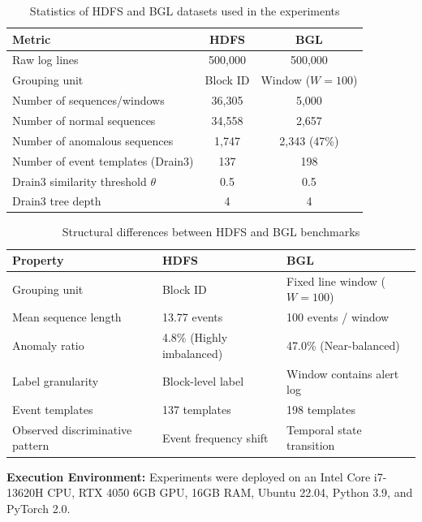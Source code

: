 \documentclass[conference]{IEEEtran}
\begin{document}
\begin{table}[!t]
\caption{Statistics of HDFS and BGL datasets used in the experiments}
\begin{center}
\scriptsize
\begin{tabular}{lcc}
\toprule
\textbf{Metric} & \textbf{HDFS} & \textbf{BGL} \\
\midrule
Raw log lines & 500,000 & 500,000 \\
Grouping unit & Block ID & Window ($W{=}100$) \\
Number of sequences/windows & 36,305 & 5,000 \\
Number of normal sequences & 34,558 & 2,657 \\
Number of anomalous sequences & 1,747 & 2,343 (47\%) \\
Number of event templates (Drain3) & 137 & 198 \\
Drain3 similarity threshold $\theta$ & 0.5 & 0.5 \\
Drain3 tree depth & 4 & 4 \\
\bottomrule
\end{tabular}
\label{tab_dataset_stats}
\end{center}
\end{table}

\begin{table}[!t]
\caption{Structural differences between HDFS and BGL benchmarks}
\begin{center}
\scriptsize
\setlength{\tabcolsep}{2pt}
\begin{tabular}{lll}
\toprule
\textbf{Property} & \textbf{HDFS} & \textbf{BGL} \\
\midrule
Grouping unit & Block ID & Fixed line window ($W{=}100$) \\
Mean sequence length & 13.77 events & 100 events / window \\
Anomaly ratio & 4.8\% (Highly imbalanced) & 47.0\% (Near-balanced) \\
Label granularity & Block-level label & Window contains alert log \\
Event templates & 137 templates & 198 templates \\
Observed discriminative pattern & Event frequency shift & Temporal state transition \\
\bottomrule
\end{tabular}
\label{tab_dataset_comparison}
\end{center}
\end{table}

\textbf{Execution Environment:} Experiments were deployed on an Intel Core i7-13620H CPU, RTX 4050 6GB GPU, 16GB RAM, Ubuntu 22.04, Python 3.9, and PyTorch 2.0.
\end{document}
